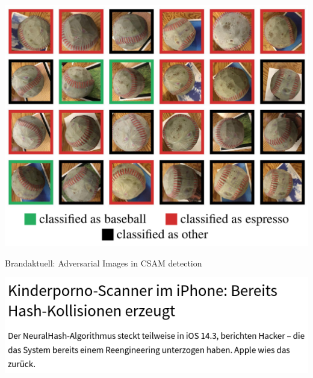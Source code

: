 \documentclass[aspectratio=169,usenames,dvipsnames]{beamer}
\begin{document}
\begin{frame}
\begin{center}
\includegraphics[height=0.9\textheight,keepaspectratio]{images/baseball_class} 
\end{center}
\end{frame}

\begin{frame}
\begin{center}
Brandaktuell: Adversarial Images in CSAM detection
\bigskip

\includegraphics[height=0.4\textheight,keepaspectratio]{images/heise_headline_neuralhash} 
\end{center}
\end{frame}
\end{document}
